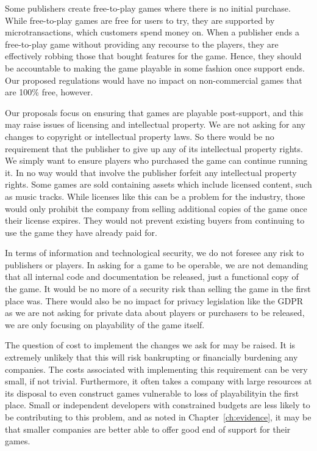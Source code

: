 Some publishers create free-to-play games where there is no initial purchase.
While free-to-play games are free for users to try, they are supported by \glspl{microtransaction}, which customers spend money on\cn.
When a publisher ends a free-to-play game without providing any recourse to the players, they are effectively robbing those that bought features for the game.
Hence, they should be accountable to making the game playable in some fashion once support ends.
Our proposed regulations would have no impact on non-commercial games that are 100\% free, however.

Our proposals focus on ensuring that games are playable post-support, and this may raise issues of licensing and intellectual property.
We are not asking for any changes to copyright or intellectual property laws.
So there would be no requirement that the publisher to give up any of its intellectual property rights.
We simply want to ensure players who purchased the game can continue running it.
In no way would that involve the publisher forfeit any intellectual property rights.
Some games are sold containing \glspl{asset} which include licensed content, such as music tracks.
While licenses like this can be a problem for the industry, those would only prohibit the company from selling additional copies of the game once their license expires.
They would not prevent existing buyers from continuing to use the game they have already paid for.

In terms of information and technological security, we do not foresee any risk to publishers or players.
In asking for a game to be operable, we are not demanding that all internal code and documentation be released, just a functional copy of the game.
It would be no more of a security risk than selling the game in the first place was.
There would also be no impact for privacy legislation like the GDPR as we are not asking for private data about players or purchasers to be released,
we are only focusing on playability of the game itself.

The question of cost to implement the changes we ask for may be raised.
It is extremely unlikely that this will risk bankrupting or financially burdening any companies.
The costs associated with implementing this requirement can be very small, if not trivial\cn.
Furthermore, it often takes a company with large resources at its disposal to even construct games vulnerable to loss of playability\cn in the first place.
Small or independent developers with constrained budgets are less likely to be contributing to this problem,
and as noted in Chapter~\ref{ch:evidence}, it may be that smaller companies are better able to offer good end of support for their games.
